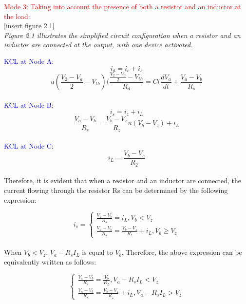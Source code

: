 \large\textcolor{red}{Mode 3: Taking into account the presence of both a resistor and an inductor at the load:}\\

[insert figure 2.1]\\

\emph{Figure 2.1 illustrates the simplified circuit configuration when a resistor and an inductor are connected at the output, with one device activated.}

\textcolor{blue}{KCL at Node A:}\\
\begin{equation}
    i_d=i_c+i_s
\end{equation}
\begin{equation}
    u(\frac{V_2-V_a}{2}-V_{th})(\frac{\frac{V_2-V_a}{2}-V_{th}}{R_d}=C(\frac{dV_a}{dt}+\frac{V_a-V_b}{R_s}
\end{equation}\\

\textcolor{blue}{KCL at Node B:}\\
\begin{equation}
    i_s=i_z+i_L
\end{equation}
\begin{equation}
    \frac{V_a-V_b}{R_s}=\frac{V_b-V_z}{R_z}u(V_b-V_z)+i_L
\end{equation}\\

\textcolor{blue}{KCL at Node C:}\\
\begin{equation}
    i_L=\frac{V_b-V_c}{R_2}
\end{equation}\\

Therefore, it is evident that when a resistor and an inductor are connected, the current flowing through the resistor Rs can be determined by the following expression:

\begin{equation}
     i_s=\begin{cases}
        \frac{V_a-V_b}{R_s}=i_L,  V_b<V_z\\
        \frac{V_a-V_b}{R_s}=\frac{V_b-V_z}{R_z}+i_L,  V_b \geq V_z
        \end{cases}
\end{equation}\\

When $V_b < V_z$, $V_a - R_sI_L$ is equal to $V_b$. Therefore, the above expression can be equivalently written as follows:

\begin{equation}
    \begin{cases}
        \frac{V_a-V_b}{R_s}=\frac{V_b}{R_L}, V_a-R_sI_L<V_z\\
        \frac{V_a-V_b}{R_s}=\frac{V_b-V_z}{R_z}+i_L, V_a-R_sI_L>V_z
    \end{cases}
\end{equation}\\

